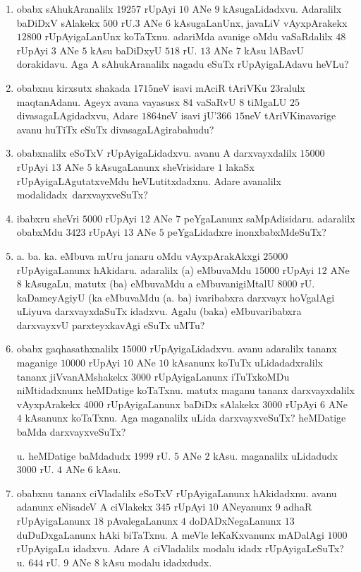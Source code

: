 \begin{enumerate}[\rm(1)]
\item obabx sAhukAranalilx $19257$ rUpAyi $10$ ANe $9$ kAsugaLidadxvu. Adaralilx baDiDxV sAlakekx $500$ rU.\break $3$ ANe $6$ kAsugaLanUnx, javaLiV vAyxpArakekx $12800$ rUpAyigaLanUnx koTaTxnu. adariMda avanige oMdu vaSaRdalilx $48$ rUpAyi $3$ ANe $5$ kAsu baDiDxyU $518$ rU. $13$ ANe $7$ kAsu lABavU dorakidavu. Aga A sAhukAranalilx nagadu eSuTx rUpAyigaLAdavu heVLu?

\item obabxnu kirxsutx shakada $1715$neV isavi mAciR tAriVKu $23$ralulx maqtanAdanu. Ageyx avana vayasusx $84$ vaSaRvU $8$ tiMgaLU $25$ divasagaLAgidadxvu, Adare $1864$neV isavi jU\char'366 $15$neV tAriVKinavarige avanu huTiTx eSuTx divasagaLAgirabahudu?

\item obabxnalilx eSoTxV rUpAyigaLidadxvu. avanu A darxvayxdalilx $15000$ rUpAyi $13$ ANe $5$ kAsugaLanunx sheVrisidare $1$ lakaSx rUpAyigaLAgutatxveMdu heVLutitxdadxnu. Adare avanalilx modalidadx\ darxvayxveSuTx?

\item ibabxru sheVri $5000$ rUpAyi $12$ ANe $7$ peYgaLanunx saMpAdisidaru. adaralilx obabxMdu $3423$ rUpAyi $13$ ANe $5$ peYgaLidadxre inonxbabxMdeSuTx?

\item a. ba. ka. eMbuva mUru janaru oMdu vAyxpArakAkxgi $25000$ rUpAyigaLanunx hAkidaru. adaralilx (a) eMbuvaMdu $15000$ rUpAyi $12$ ANe $8$ kAsugaLu, matutx (ba) eMbuvaMdu a eMbuvanigiMtalU $8000$ rU. kaDameyAgiyU (ka eMbuvaMdu (a. ba) ivaribabxra darxvayx hoVgalAgi uLiyuva darxvayxdaSuTx idadxvu. Agalu (baka) eMbuvaribabxra darxvayxvU parxteyxkavAgi eSuTx uMTu?

\item obabx gaqhasathxnalilx $15000$ rUpAyigaLidadxvu. avanu adaralilx tananx maganige $10000$ rUpAyi $10$ ANe $10$ kAsanunx koTuTx uLidadadxralilx tananx jiVvanAMshakekx $3000$ rUpAyigaLanunx iTuTxkoMDu niMtidadxnunx heMDatige koTaTxnu. matutx maganu tananx darxvayxdalilx vAyxpArakekx $4000$ rUpAyigaLanunx baDiDx sAlakekx $3000$ rUpAyi $6$ ANe $4$ kAsanunx koTaTxnu. Aga maganalilx uLida darxvayxveSuTx? heMDatige baMda darxvayxveSuTx?

u. heMDatige baMdadudx $1999$ rU. $5$ ANe $2$ kAsu. maganalilx uLidadudx $3000$ rU. $4$ ANe $6$ kAsu.

\item obabxnu tananx ciVladalilx eSoTxV rUpAyigaLanunx hAkidadxnu. avanu adanunx eNisadeV A ciVlakekx $345$ rUpAyi $10$ ANeyanunx $9$ adhaR rUpAyigaLanunx $18$ pAvalegaLanunx $4$ doDADxNegaLanunx $13$ duDuDxgaLanunx hAki biTaTxnu. A meVle leKaKxvanunx mADalAgi $1000$ rUpAyigaLu idadxvu. Adare A ciVladalilx modalu idadx rUpAyigaLeSuTx?
\hfill u. $644$ rU. $9$ ANe $8$ kAsu modalu idadxdudx.


\end{enumerate}
